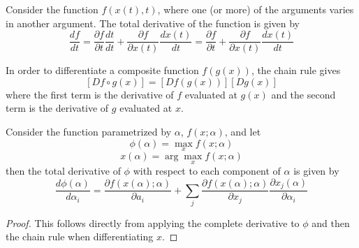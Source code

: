 


\begin{definition}
  Consider the function $f(x(t), t)$, where one (or more) of the
  arguments varies in another argument. The total derivative of the
  function is given by
  \[
  \frac{df}{dt} 
  = \frac{\partial f}{\partial t} \frac{dt}{dt}
  + \frac{\partial f}{\partial x(t)} \frac{dx(t)}{dt}
  = \frac{\partial f}{\partial t} 
  + \frac{\partial f}{\partial x(t)} \frac{dx(t)}{dt}
  \]
\end{definition}

\begin{definition}
  In order to differentiate a composite function $f(g(x))$, the chain
  rule gives
  \[
  [D f \circ g(x)] = [Df(g(x))][Dg(x)]
  \]
  where the first term is the derivative of $f$ evaluated at $g(x)$
  and the second term is the derivative of $g$ evaluated at $x$.
\end{definition}

\begin{prop}
  Consider the function parametrized by $\alpha$, $f(x; \alpha)$, and
  let 
  \[
  \phi(\alpha) = \max_x f(x; \alpha)
  \]
  \[
  x(\alpha) = \arg \max_x f(x; \alpha)
  \]
  then the total derivative of $\phi$ with respect to each component
  of $\alpha$ is given by
  \[
  \frac{d \phi(\alpha)}{d \alpha_i}
  = \frac{\partial f(x(\alpha); \alpha)}{\partial a_i}
  + \sum_j 
  \frac{\partial f(x(\alpha);\alpha)}{\partial x_j}
  \frac{\partial x_j(\alpha)}{\partial \alpha_i}
  \]
\end{prop}

\begin{proof}
  This follows directly from applying the complete derivative to
  $\phi$ and then the chain rule when differentiating $x$.
\end{proof}
